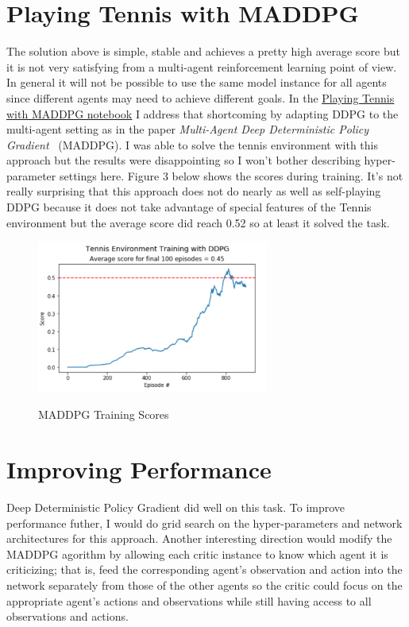 \documentclass[sigchi]{acmart}
\begin{document}
\section{Playing Tennis with MADDPG}
The solution above is simple, stable and achieves a pretty high average score but it is not very satisfying from a multi-agent reinforcement learning point of view.  In general it will not be possible to use the same model instance for all agents since different agents may need to achieve different goals.
In the 
\href{https://nbviewer.jupyter.org/github/bobflagg/Collaboration-and-Competition/blob/master/02-Playing-Tennis-with-MADDPG.ipynb}{\underline{Playing Tennis with MADDPG notebook}}
 I address that shortcoming by adapting DDPG to the multi-agent setting as in the paper {\em Multi-Agent Deep Deterministic Policy Gradient}~\cite{DBLP:journals/corr/LoweWTHAM17} (MADDPG).   I was able to solve the tennis environment with this approach but the results were disappointing so I won't bother describing hyper-parameter settings here.  Figure 3 below shows the scores during training.  It's not really surprising that this approach does not do nearly as well as self-playing DDPG because it does not take advantage of special features of the Tennis environment but the average score did reach 0.52 so at least it solved the task.
\begin{figure}[h]
	\centering
	\includegraphics[width=3.0in]{ma-scores}
	\label{fig:ddpg-scores}
	\caption{MADDPG Training Scores}
\end{figure}

\section{Improving Performance}

Deep Deterministic Policy Gradient did well on this task.  To improve performance futher, I would do grid search on the hyper-parameters and network architectures for this approach.  Another interesting direction would modify the MADDPG agorithm by allowing each critic instance to know which agent it is criticizing; that is, feed the corresponding agent's observation and action into the network separately from those of the other agents so the critic could focus on the appropriate agent's actions and observations while still having access to all observations and actions.



\end{document}
